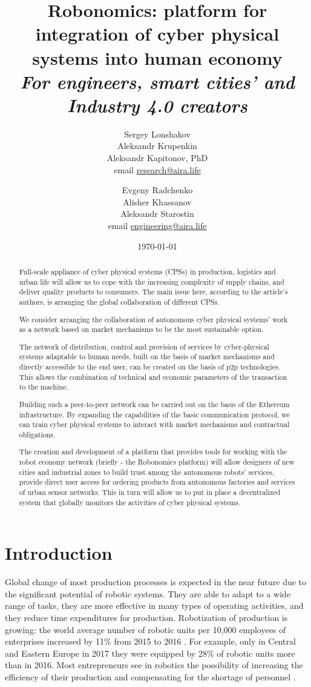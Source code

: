 \documentclass{article}
\title{Robonomics: platform for integration of cyber physical systems into human economy \\ \small
\textit{For engineers, smart cities' and Industry 4.0 creators}}
\date{\today}
\author{Sergey Lonshakov \\ Aleksandr Krupenkin \\ Aleksandr Kapitonov, PhD \\ email \href{mailto:research@aira.life}{research@aira.life} \and Evgeny Radchenko \\ Alisher Khassanov \\ Aleksandr Starostin \\ email \href{mailto:engineering@aira.life}{engineering@aira.life} }
\begin{document}
\maketitle
 
\begin{abstract}
Full-scale appliance of cyber physical systems (CPSs) in production, logistics and urban life will allow us to cope with the increasing complexity of supply chains, and deliver quality products to consumers. The main issue here, according to the article's authors, is arranging the global collaboration of different CPSs.

We consider arranging the collaboration of autonomous cyber physical systems' work as a network based on market mechanisms to be the most sustainable option.

The network of distribution, control and provision of services by cyber-physical systems adaptable to human needs, built on the basis of market mechanisms and directly accessible to the end user, can be created on the basis of p2p technologies. This allows the combination of technical and economic parameters of the transaction to the machine.

Building such a peer-to-peer network can be carried out on the basis of the Ethereum infrastructure. By expanding the capabilities of the basic communication protocol, we can train cyber physical systems to interact with market mechanisms and contractual obligations.

The creation and development of a platform that provides tools for working with the robot economy network (briefly - the Robonomics platform) will allow designers of new cities and industrial zones to build trust among the autonomous robots' services, provide direct user access for ordering products from autonomous factories and services of urban sensor networks. This in turn will allow us to put in place a decentralized system that globally monitors the activities of cyber physical systems.
\end{abstract}

\tableofcontents

\section{Introduction}
Global change of most production processes is expected in the near future \cite{Pedersen2016RobotDeployment}  due to the significant potential of robotic systems. They are able to adapt \cite{Stock2016Opportunities4.0} to a wide range of tasks, they are more effective in many types of operating activities, and they reduce time expenditures for production. Robotization of production is growing: the world average number of robotic units per 10,000 employees of enterprises increased by 11\% from 2015 to 2016 \cite{2018RobotRobotics.}. For example, only in Central and Eastern Europe in 2017 they were equipped by 28\% \cite{2018EnterFactories} of robotic units more than in 2016. Most entrepreneurs see in robotics the possibility of increasing the efficiency of their production and compensating for the shortage of personnel \cite{2018EnterFactories}.
\end{document}
